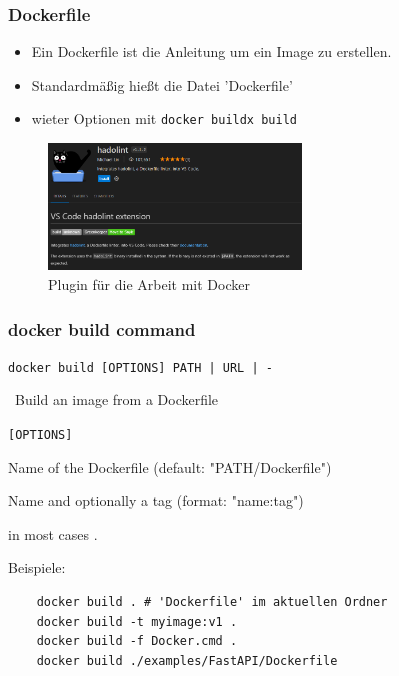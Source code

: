 \documentclass[22pt]{beamer}
\newcommand{\code}[1]{\colorbox{gray!10}{\texttt{#1}}}
\newcommand{\desclabel}[1]{\textcolor{cyan}{#1}}
\begin{document}
\begin{frame}[fragile]
    \frametitle{Dockerfile}
    \begin{itemize}
        \item Ein Dockerfile ist die Anleitung um ein Image zu erstellen.
        \item Standardmäßig hießt die Datei 'Dockerfile'
        \item wieter Optionen mit \code{docker buildx build}
    \end{itemize}
    \begin{figure}[h]
        \centering
        \includegraphics[width=0.6\textwidth]{Bilder/Hadolint.png}
        \caption*{Plugin für die Arbeit mit Docker}
    \end{figure}

\end{frame}

\begin{frame}[fragile]
    \frametitle{docker build command}
    \code{docker build [OPTIONS] PATH | URL | -} 
    
    \-  \ Build an image from a Dockerfile

    \code{[OPTIONS]}
    \begin{description}[labelindent=0.5cm, style=unboxed, labelwidth=\widthof{-f, --file string}, leftmargin=!]
        \item[\desclabel{-f, --file string}] Name of the Dockerfile (default: "PATH/Dockerfile")
        \item[\desclabel{-t, --tag stringArray}] Name and optionally a tag (format: "name:tag")
        \item[\desclabel{PATH}] in most cases .
    \end{description}

    Beispiele: %
    \begin{verbatim}
    docker build . # 'Dockerfile' im aktuellen Ordner
    docker build -t myimage:v1 . 
    docker build -f Docker.cmd . 
    docker build ./examples/FastAPI/Dockerfile
    \end{verbatim}
    
\end{frame}
\end{document}
